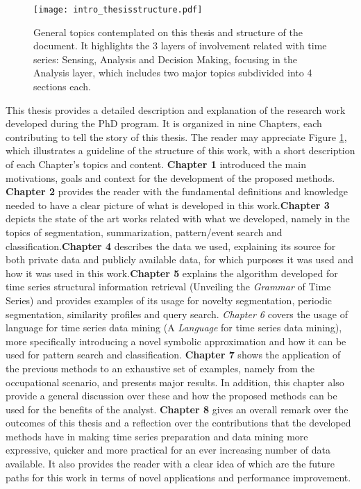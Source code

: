 \begin{figure}
\centering
\texttt{[image: intro\_thesisstructure.pdf]}
\caption{General topics contemplated on this thesis and structure of the document. It highlights the 3 layers of involvement related with time series: Sensing, Analysis and Decision Making, focusing in the Analysis layer, which includes two major topics subdivided into 4 sections each.}
\label{fig:intro}
\end{figure}

This thesis provides a detailed description and explanation of the research work developed during the PhD program. It is organized in nine Chapters, each contributing to tell the story of this thesis. The reader may appreciate Figure \ref{fig:intro}, which illustrates a guideline of the structure of this work, with a short description of each Chapter's topics and content. \textbf{Chapter 1} introduced the main motivations, goals and context for the development of the proposed methods. \textbf{Chapter 2} provides the reader with the fundamental definitions and knowledge needed to have a clear picture of what is developed in this work.\textbf{Chapter 3} depicts the state of the art works related with what we developed, namely in the topics of segmentation, summarization, pattern/event search and classification.\textbf{Chapter 4} describes the data we used, explaining its source for both private data and publicly available data, for which purposes it was used and how it was used in this work.\textbf{Chapter 5} explains the algorithm developed for time series structural information retrieval (Unveiling the \textit{Grammar} of Time Series) and provides examples of its usage for novelty segmentation, periodic segmentation, similarity profiles and query search. \textit{Chapter 6} covers the usage of language for time series data mining (A \textit{Language} for time series data mining), more specifically introducing a novel symbolic approximation and how it can be used for pattern search and classification. \textbf{Chapter 7} shows the application of the previous methods to an exhaustive set of examples, namely from the occupational scenario, and presents major results. In addition, this chapter also provide a general discussion over these and how the proposed methods can be used for the benefits of the analyst. \textbf{Chapter 8} gives an overall remark over the outcomes of this thesis and a reflection over the contributions that the developed methods have in making time series preparation and data mining more expressive, quicker and more practical for an ever increasing number of data available. It also provides the reader with a clear idea of which are the future paths for this work in terms of novel applications and performance improvement.

